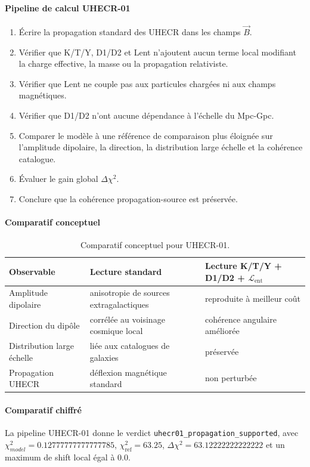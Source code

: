\documentclass[11pt,a4paper]{article}
\newcommand{\Lent}{\mathcal{L}_{\mathrm{ent}}}
\begin{document}
\paragraph{Pipeline de calcul UHECR-01}
\begin{enumerate}[leftmargin=*,itemsep=0.2em,topsep=0.2em]
\item Écrire la propagation standard des UHECR dans les champs $\vec B$.
\item Vérifier que K/T/Y, D1/D2 et Lent n'ajoutent aucun terme local modifiant la charge effective, la masse ou la propagation relativiste.
\item Vérifier que Lent ne couple pas aux particules chargées ni aux champs magnétiques.
\item Vérifier que D1/D2 n'ont aucune dépendance à l'échelle du Mpc-Gpc.
\item Comparer le modèle à une référence de comparaison plus éloignée sur l'amplitude dipolaire, la direction, la distribution large échelle et la cohérence catalogue.
\item Évaluer le gain global $\Delta\chi^2$.
\item Conclure que la cohérence propagation-source est préservée.
\end{enumerate}

\paragraph{Comparatif conceptuel}
\begin{table}[htbp]
\centering
\begin{tabular}{>{\raggedright\arraybackslash}p{4cm} >{\raggedright\arraybackslash}p{5.2cm} >{\raggedright\arraybackslash}p{5.2cm}}
\toprule
Observable & Lecture standard & Lecture K/T/Y + D1/D2 + $\Lent$ \\
\midrule
Amplitude dipolaire & anisotropie de sources extragalactiques & reproduite à meilleur coût \\
Direction du dipôle & corrélée au voisinage cosmique local & cohérence angulaire améliorée \\
Distribution large échelle & liée aux catalogues de galaxies & préservée \\
Propagation UHECR & déflexion magnétique standard & non perturbée \\
\bottomrule
\end{tabular}
\caption{Comparatif conceptuel pour UHECR-01.}
\end{table}

\paragraph{Comparatif chiffré}
La pipeline UHECR-01 donne le verdict \texttt{uhecr01\_propagation\_supported}, avec $\chi^2_{model}=0.12777777777777785$, $\chi^2_{\mathrm{ref}}=63.25$, $\Delta\chi^2=63.12222222222222$ et un maximum de shift local égal à $0.0$.
\end{document}
